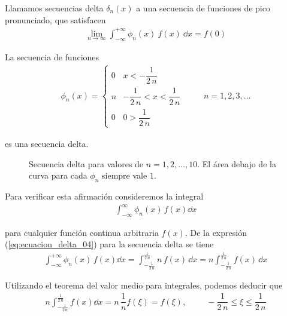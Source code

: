 \begin{defi}
Llamamos secuencias delta $\delta_{n} (x)$ a una secuencia de funciones de pico pronunciado, que satisfacen
\begin{align*}
\lim_{n \to \infty} \int_{-\infty}^{+ \infty} \phi_{n} (x) \: f(x) \: \dd{x} =  f(0)
\end{align*}
\end{defi}

\begin{ejemplo}
La secuencia de funciones
\begin{align}
\phi_{n} (x) = \begin{cases}
0 & x < - \dfrac{1}{2 \, n} \\
n & - \dfrac{1}{2 \, n} < x < \dfrac{1}{2 \, n} \\
0 & 0 >  \dfrac{1}{2 \, n}
\end{cases}
\hspace{1cm} n = 1, 2, 3, \ldots
\label{eq:ecuacion_delta_04}
\end{align}

es una secuencia delta.
\end{ejemplo}
\begin{figure}[H]
    \centering
    
    \caption{Secuencia delta para valores de $n=1,2,\ldots,10$. El área debajo de la curva para cada $\phi_{n}$ siempre vale $1$.}
    \label{fig:secuncia_delta_01}
\end{figure}

Para verificar esta afirmación consideremos la integral
\begin{align*}
\int_{-\infty}^{\infty} \phi_{n} (x) \, f(x) \dd{x}
\end{align*}

para cualquier función continua arbitraria $f(x)$. De la expresión (\ref{eq:ecuacion_delta_04}) para la secuencia delta se tiene
\begin{align*}
\int_{-\infty}^{+ \infty} \phi_{n} (x) \, f(x) \dd{x} = \int_{-\frac{1}{2 \, n}}^{\frac{1}{2 \, n}} n \, f(x) \, \dd{x} = n \int_{-\frac{1}{2 \, n}}^{\frac{1}{2 \, n}} f(x) \,  \dd{x}
\end{align*}

Utilizando el teorema del valor medio para integrales, podemos deducir que
\begin{align*}
n \int_{-\frac{1}{2 \, n}}^{\frac{1}{2 \, n}} f(x) \dd{x} = n \, \dfrac{1}{n} f(\xi) = f(\xi), \hspace{1cm} - \dfrac{1}{2 \, n} \leq \xi \leq \dfrac{1}{2 \, n}
\end{align*}

